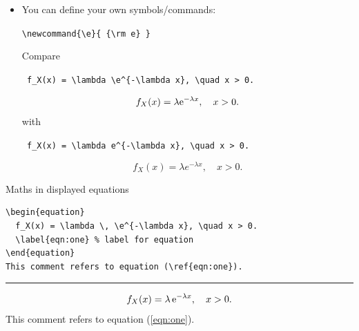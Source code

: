 \documentclass{beamer}             %
\begin{document}
\newcommand{\e}{ {\rm e} } %
\begin{frame}[containsverbatim]
\begin{itemize}
\setlength{\itemsep}{.25cm}
\item You can define your own symbols/commands:\\
\begin{center}
\verb!\newcommand{\e}{ {\rm e} }!
\end{center}
Compare
\begin{center}
\verb! f_X(x) = \lambda \e^{-\lambda x}, \quad x > 0. !
\end{center}
\medskip
\[ f_X(x) = \lambda \e^{-\lambda x}, \quad x > 0.  \]
with
\begin{center}
\verb! f_X(x) = \lambda e^{-\lambda x}, \quad x > 0. !
\end{center}
\medskip
\[ f_X(x) = \lambda e^{-\lambda x}, \quad x > 0.  \]
\end{itemize}

\end{frame}

\begin{frame}[containsverbatim]{Maths in displayed equations}

\begin{verbatim}
\begin{equation}
  f_X(x) = \lambda \, \e^{-\lambda x}, \quad x > 0.
  \label{eqn:one} % label for equation
\end{equation}
This comment refers to equation (\ref{eqn:one}).
\end{verbatim}

\vspace{.5cm}
\hrule
\vspace{.5cm}

\begin{equation}
  f_X(x) = \lambda \, \e^{-\lambda x}, \quad x > 0.
  \label{eqn:one} %
\end{equation}
This comment refers to equation (\ref{eqn:one}).

\end{frame}
\end{document}
